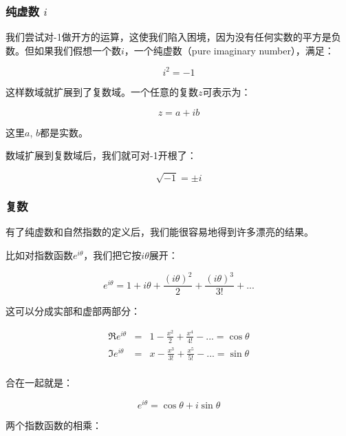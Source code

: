 \subsubsection{纯虚数 $i$}


我们尝试对-1做开方的运算，这使我们陷入困境，因为没有任何实数的平方是负数。但如果我们假想一个数$i$，一个纯虚数（pure imaginary number），满足：

\begin{equation}
i^2 = -1
\end{equation}

这样数域就扩展到了复数域。一个任意的复数$z$可表示为：

\begin{equation}
z = a + ib
\end{equation}

这里$a$, $b$都是实数。

数域扩展到复数域后，我们就可对-1开根了：

\begin{equation}
\sqrt{-1} = \pm i
\end{equation}

\subsubsection{复数}

有了纯虚数和自然指数的定义后，我们能很容易地得到许多漂亮的结果。

比如对指数函数$e^{i \theta}$，我们把它按$i \theta$展开：

\begin{equation*}
e^{i \theta} = 1 + i \theta + \frac{(i \theta)^2}{2}+ \frac{(i \theta)^3}{3!} + ...
\end{equation*}

这可以分成实部和虚部两部分：

\begin{eqnarray*}
\Re e^{i \theta} & = & 1 - \frac{x^2}{2} + \frac{x^4}{4!} - ... = \cos \theta   \\
\Im e^{i \theta} & = & x - \frac{x^3}{3!} + \frac{x^5}{5!} - ... = \sin \theta \\
\end{eqnarray*}

合在一起就是：

\begin{equation}
e^{i \theta} = \cos \theta + i \sin \theta
\end{equation}

两个指数函数的相乘：

